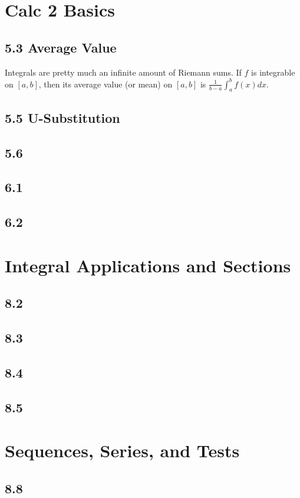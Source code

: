 \documentclass{article}
\begin{document}
    \section{Calc 2 Basics}
        \color{BrickRed}
        \subsection*{5.3 Average Value}
            Integrals are pretty much an infinite amount of Riemann sums.
            If $f$ is integrable on $[a, b]$, then its average value (or mean) on $[a, b]$ is $\frac{1}{b-a}\int_{a}^{b}f(x)dx$.
        \color{Black}
        \subsection*{5.5 U-Substitution}
        \subsection*{5.6 }
        \subsection*{6.1 }
        \subsection*{6.2 }
    \section{Integral Applications and Sections}
        \subsection*{8.2}
        \subsection*{8.3}
        \subsection*{8.4}
        \subsection*{8.5}
    \section{Sequences, Series, and Tests}
        \subsection*{8.8}
\end{document}
